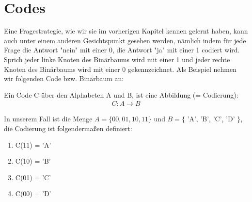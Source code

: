 \section{Codes}
Eine Fragestrategie, wie wir sie im vorherigen Kapitel kennen gelernt haben, kann auch unter einem anderen Gesichtspunkt gesehen werden, nämlich indem für jede Frage die Antwort "nein" mit einer
0, die Antwort "ja" mit einer 1 codiert wird. \\
Sprich jeder linke Knoten des Binärbaums wird mit einer 1 und jeder rechte Knoten des Binärbaums wird mit einer 0 gekennzeichnet.
Als Beispiel nehmen wir folgenden Code bzw. Binärbaum an:\\
\begin{center}\end{center}
\begin{definition}[Code]
Ein Code C über den Alphabeten A und B, ist eine Abbildung (= Codierung):
\begin{align}
C: A \rightarrow B
\end{align}
\end{definition}
In unserem Fall ist die Menge $A = \lbrace 00, 01, 10, 11 \rbrace$ und $B = \lbrace$ 'A', 'B', 'C', 'D' $\rbrace$, die Codierung ist folgendermaßen definiert:\\
\begin{enumerate}
\item C(11) = 'A'
\item C(10) = 'B'
\item C(01) = 'C'
\item C(00) = 'D'
\end{enumerate}

